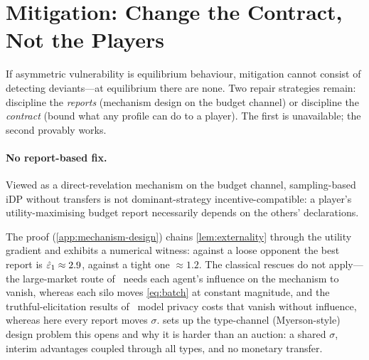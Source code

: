 \section{Mitigation: Change the Contract, Not the Players}
\label{sec:mitigation}

If asymmetric vulnerability is equilibrium behaviour, mitigation cannot
consist of detecting deviants---at equilibrium there are none. Two
repair strategies remain: discipline the \emph{reports} (mechanism
design on the budget channel) or discipline the \emph{contract} (bound
what any profile can do to a player). The first is unavailable; the
second provably works.

\paragraph{No report-based fix.} Viewed as a direct-revelation
mechanism on the budget channel, sampling-based \ac{iDP} without transfers
is not dominant-strategy incentive-compatible: a player's
utility-maximising budget report necessarily depends on the others'
declarations.


The proof (\cref{app:mechanism-design}) chains
\cref{lem:externality} through the utility gradient and exhibits a
numerical witness: against a loose opponent the best report is
$\hat{\varepsilon}_1 \approx 2.9$, against a tight one $\approx 1.2$. The
classical rescues do not apply---the large-market route
of~\cite{kearns2014mechanism} needs each agent's influence on the
mechanism to vanish, whereas each silo moves \eqref{eq:batch} at constant
magnitude, and the truthful-elicitation results
of~\cite{ghosh2011selling, chen2013truthful, nissim2014redrawing}
model privacy costs that vanish without influence, whereas here every
report moves $\sigma$.  sets up the
type-channel (Myerson-style) design problem this opens and why it is
harder than an auction: a shared $\sigma$, interim advantages coupled
through all types, and no monetary transfer.

